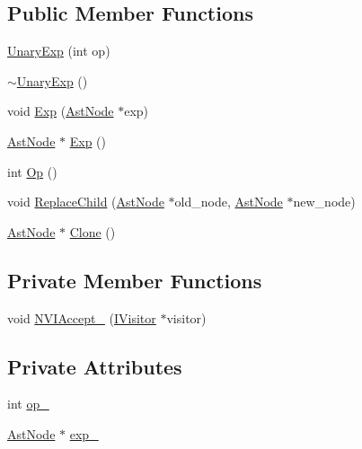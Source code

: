 \subsection*{Public Member Functions}
\begin{DoxyCompactItemize}
\item 
\hyperlink{classmocha_1_1_unary_exp_a8eef769a18ba2aa04af32d3a1b670ffb}{UnaryExp} (int op)
\item 
\hyperlink{classmocha_1_1_unary_exp_a384ca849167cf31d8ef32f3e15b3aee4}{$\sim$UnaryExp} ()
\item 
void \hyperlink{classmocha_1_1_unary_exp_a2e3c14beb4eaac93ba1df06e87a0b89f}{Exp} (\hyperlink{classmocha_1_1_ast_node}{AstNode} $\ast$exp)
\item 
\hyperlink{classmocha_1_1_ast_node}{AstNode} $\ast$ \hyperlink{classmocha_1_1_unary_exp_a131cd60d5d6690cdff23b51f2404bece}{Exp} ()
\item 
int \hyperlink{classmocha_1_1_unary_exp_ae7d7bedb557f34d60929d48fd4d14240}{Op} ()
\item 
void \hyperlink{classmocha_1_1_unary_exp_a8baa0af13def3a4a1f3fd27b5df7fd05}{ReplaceChild} (\hyperlink{classmocha_1_1_ast_node}{AstNode} $\ast$old\_\-node, \hyperlink{classmocha_1_1_ast_node}{AstNode} $\ast$new\_\-node)
\item 
\hyperlink{classmocha_1_1_ast_node}{AstNode} $\ast$ \hyperlink{classmocha_1_1_unary_exp_ad039d38166e2fa193f578ae4e91d81ea}{Clone} ()
\end{DoxyCompactItemize}
\subsection*{Private Member Functions}
\begin{DoxyCompactItemize}
\item 
void \hyperlink{classmocha_1_1_unary_exp_a4f5a48831784abe08a1d31c7664827a1}{NVIAccept\_\-} (\hyperlink{classmocha_1_1_i_visitor}{IVisitor} $\ast$visitor)
\end{DoxyCompactItemize}
\subsection*{Private Attributes}
\begin{DoxyCompactItemize}
\item 
int \hyperlink{classmocha_1_1_unary_exp_aefb5fdc7971ce049036dc626fd6d97f9}{op\_\-}
\item 
\hyperlink{classmocha_1_1_ast_node}{AstNode} $\ast$ \hyperlink{classmocha_1_1_unary_exp_afbe580a73a5e48555f513b7096c74f9b}{exp\_\-}
\end{DoxyCompactItemize}


